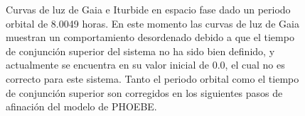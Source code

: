 \begin{figure}[!h]
	\caption{Curvas de luz de Gaia e Iturbide en espacio fase dado un periodo
		orbital de 8.0049 horas. En este momento las curvas de luz de Gaia
		muestran un comportamiento desordenado debido a que el tiempo de
		conjunción superior del sistema no ha sido bien definido, y actualmente
		se encuentra en su valor inicial de $0.0$, el cual no es correcto para
		este sistema. Tanto el periodo orbital como el tiempo de conjunción
		superior son corregidos en los siguientes pasos de afinación del modelo
		de PHOEBE.}
	\label{gaiaIturbidePhaseFold}
\end{figure}
